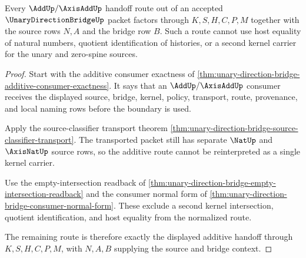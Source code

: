 \begin{theorem}
\label{thm:unary-direction-bridge-additive-route-scope}
Every $\AddUp/\AxisAddUp$ handoff route out of an accepted $\UnaryDirectionBridgeUp$ packet factors through $K,S,H,C,P,M$ together with the source rows $N,A$ and the bridge row $B$. Such a route cannot use host equality of natural numbers, quotient identification of histories, or a second kernel carrier for the unary and zero-spine sources.
\end{theorem}
\begin{proof}
Start with the additive consumer exactness of \autoref{thm:unary-direction-bridge-additive-consumer-exactness}. It says that an $\AddUp/\AxisAddUp$ consumer receives the displayed source, bridge, kernel, policy, transport, route, provenance, and local naming rows before the boundary is used.

Apply the source-classifier transport theorem \autoref{thm:unary-direction-bridge-source-classifier-transport}. The transported packet still has separate $\NatUp$ and $\AxisNatUp$ source rows, so the additive route cannot be reinterpreted as a single kernel carrier.

Use the empty-intersection readback of \autoref{thm:unary-direction-bridge-empty-intersection-readback} and the consumer normal form of \autoref{thm:unary-direction-bridge-consumer-normal-form}. These exclude a second kernel intersection, quotient identification, and host equality from the normalized route.

The remaining route is therefore exactly the displayed additive handoff through $K,S,H,C,P,M$, with $N,A,B$ supplying the source and bridge context.
\end{proof}

